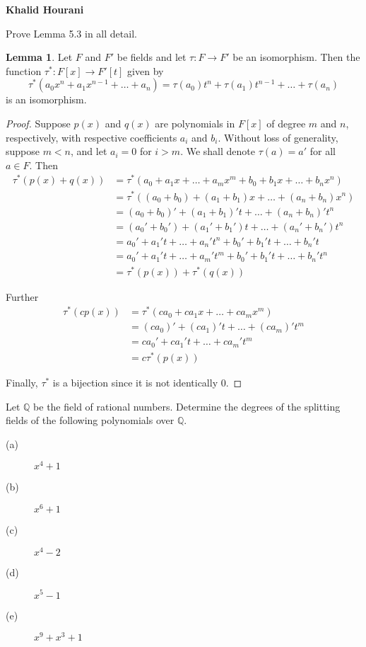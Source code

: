 \documentclass[12pt,leqno]{article}
\numberwithin{equation}{section}
\newcommand{\question}[2] {\vspace{.25in} \noindent\fbox{#1} #2 \vspace{.10in}}
\theoremstyle{definition}
\newtheorem*{Lem}{Lemma}
\begin{document}
\thispagestyle{plain}
\begin{flushright}
\large{\textbf{Khalid Hourani\\
}}
\end{flushright}

\question{3}{Prove Lemma 5.3 in all detail.}

\begin{Lem}
 Let $F$ and $F'$ be fields and let $\tau:F\to F'$ be an isomorphism. Then the function $\tau^*:F[x]\to F'[t]$ given by \[\tau^*(a_0x^n+a_1x^{n-1}+\hdots+a_n)=\tau(a_0)t^n+\tau(a_1)t^{n-1}+\hdots+\tau(a_n)\] is an isomorphism.
\end{Lem}

\begin{proof}
 Suppose $p(x)$ and $q(x)$ are polynomials in $F[x]$ of degree $m$ and $n$, respectively, with respective coefficients $a_i$ and $b_i$. Without loss of generality, suppose $m<n$, and let $a_i=0$ for $i>m$. We shall denote $\tau(a)=a'$ for all $a\in F$. Then \begin{align*}\tau^*(p(x)+q(x))&=\tau^*(a_0+a_1x+\hdots+a_mx^m+b_0+b_1x+\hdots+b_nx^n)\\&=\tau^*((a_0+b_0)+(a_1+b_1)x+\hdots+(a_n+b_n)x^n)\\&=(a_0+b_0)'+(a_1+b_1)'t+\hdots+(a_n+b_n)'t^n\\&=(a_0'+b_0')+(a_1'+b_1')t+\hdots+(a_n'+b_n')t^n\\&=a_0'+a_1't+\hdots+a_n't^n+b_0'+b_1't+\hdots+b_n't\\&=a_0'+a_1't+\hdots+a_m't^m+b_0'+b_1't+\hdots+b_n't^n\\&=\tau^*(p(x))+\tau^*(q(x))\end{align*}

Further \begin{align*}\tau^*(cp(x))&=\tau^*(ca_0+ca_1x+\hdots+ca_mx^m)\\&=(ca_0)'+(ca_1)'t+\hdots+(ca_m)'t^m\\&=ca_0'+ca_1't+\hdots+ca_m't^m\\&=c\tau^*(p(x))\end{align*}

Finally, $\tau^*$ is a bijection since it is not identically $0$.                                                                                                                                                                                            \end{proof}

\question{6}{Let $\mathbb{Q}$ be the field of rational numbers. Determine the degrees of the splitting fields of the following polynomials over $\mathbb{Q}$.}
\begin{description}
 \item [(a)] $x^4+1$
 \item [(b)] $x^6+1$
 \item [(c)] $x^4-2$
 \item [(d)] $x^5-1$
 \item [(e)] $x^9+x^3+1$
\end{description}
\end{document}
